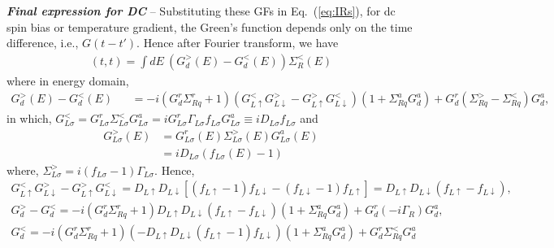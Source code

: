 \documentclass[aps,prb,superscriptaddress]{revtex4-2}
\begin{document}
{\noindent \textbf{\textit{Final expression for DC}}} -- Substituting these GFs in Eq.~(\ref{eq:IRs}), for dc spin bias or temperature gradient, the Green's function depends only on the time difference, i.e., $G(t-t')$. Hence after Fourier transform, we have
\begin{eqnarray}
[(G_{d}^>- G_{d}^<)\Sigma^<_R](t,t)=\int dE ~ (G_{d}^>(E)- G_{d}^<(E))\Sigma^<_R(E) \nonumber
\end{eqnarray}
where in energy domain,
\begin{eqnarray}
G_{d}^>(E)- G_{d}^<(E)&&= -i(G^r_{d}\Sigma^r_{Rq} +1) (G^<_{L\uparrow}G^>_{L\downarrow} -G^>_{L\uparrow} G^<_{L\downarrow}) (1+ \Sigma^a_{Rq} G^a_{d}) + G^r_{d} (\Sigma^>_{Rq}-\Sigma^<_{Rq}) G^a_{d},
   \label{inter1}
\end{eqnarray}
in which, $G^<_{L\sigma}=G^r_{L\sigma}\Sigma_{L\sigma}^{<}G^a_{L\sigma} = i G^r_{L\sigma}\Gamma_{L\sigma}f_{L\sigma}  G^a_{L\sigma} \equiv iD_{L\sigma}f_{L\sigma}$ and 
\begin{equation}
\begin{split}
G_{L\sigma}^{>}(E) &= G_{L\sigma}^{r}(E)\Sigma_{L\sigma}^{>}(E) G_{L\sigma}^{a}(E)\\
&=iD_{L\sigma}(f_{L\sigma}(E) - 1)
\end{split}
\end{equation}
where, $\Sigma_{L\sigma}^{>} = i(f_{L\sigma}-1)\Gamma_{L\sigma}$. Hence,
\begin{gather}
G_{L\uparrow}^{<} G_{L\downarrow}^{>} - G_{L\uparrow}^{>} G_{L\downarrow}^{<} = D_{L\uparrow}D_{L\downarrow} [(f_{L\uparrow}-1)f_{L\downarrow} - (f_{L\downarrow}-1) f_{L\uparrow}] = D_{L\uparrow}D_{L\downarrow} (f_{L\uparrow} - f_{L\downarrow}), \\
G_{d}^>- G_{d}^<= -i(G^r_{d}\Sigma^r_{Rq} +1) D_{L\uparrow}D_{L\downarrow} (f_{L\uparrow} - f_{L\downarrow}) (1+ \Sigma^a_{Rq} G^a_{d}) + G^r_{d} (-i\Gamma_R) G^a_{d},\label{G><}\\
G_{d}^< =-i(G^r_{d}\Sigma^r_{Rq} +1 ) (-D_{L\uparrow}D_{L\downarrow}(f_{L\uparrow}-1)f_{L\downarrow}) (1+ \Sigma^a_{Rq} G^a_{d}) + G^r_{d} \Sigma^<_{Rq} G^a_{d} \label{Gless}
\end{gather}
\end{document}
